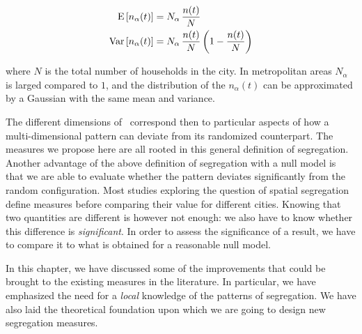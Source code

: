 \begin{align}
    \begin{split}
	\mathrm{E} \left[ n_\alpha(t) \right] &= N_\alpha\,\frac{n(t)}{N} \\
	\mathrm{Var} \left[ n_\alpha(t) \right] &= N_\alpha\,\frac{n(t)}{N} \left( 1 - \frac{n(t)}{N}  \right) 
    \end{split}
\end{align}

where $N$ is the total number of households in the city. In metropolitan areas
$N_\alpha$ is larged compared to $1$, and the distribution of the $n_\alpha(t)$
can be approximated by a Gaussian with the same mean and variance.

The different dimensions of~\cite{Massey:1988,Reardon:2004} correspond then to
particular aspects of how a multi-dimensional pattern can deviate from its
randomized counterpart. The measures we propose here are all rooted in this
general definition of segregation.
Another advantage of the above definition of segregation with a null model is
that we are able to evaluate whether the pattern deviates significantly from the
random configuration.
Most studies exploring the question of spatial segregation define measures
before comparing their value for different cities. Knowing that two quantities
are different is however not enough: we also have to know whether this
difference is {\em significant}. In order to assess the significance of a
result, we have to compare it to what is obtained for a reasonable null model.\\

\bigskip

In this chapter, we have discussed some of the improvements that could be
brought to the existing measures in the literature. In particular, we have
emphasized the need for a \emph{local} knowledge of the patterns of segregation.
We have also laid the theoretical foundation upon which we are going to design
new segregation measures.
